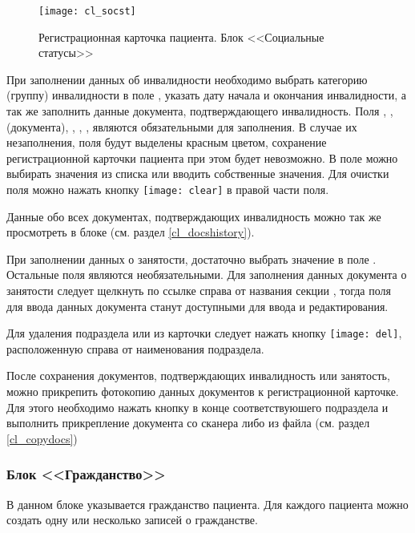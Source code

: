 {\begin{figure}[!ht]\centering
 \texttt{[image: cl\_socst]}
 \caption{Регистрационная карточка пациента. Блок <<Социальные статусы>>}
 \label{img_cl_socst}
\end{figure} 

При заполнении данных об инвалидности необходимо выбрать категорию (группу) инвалидности в поле , указать дату начала и окончания инвалидности, а так же заполнить данные документа, подтверждающего инвалидность. Поля , , (документа), , , ,  являются обязательными для заполнения.  В случае их незаполнения, поля будут выделены красным цветом, сохранение регистрационной карточки пациента при этом будет невозможно.
В поле  можно выбирать значения из списка или вводить собственные значения. Для очистки поля можно нажать кнопку \texttt{[image: clear]} в правой части поля.

\begin{prim}
Данные обо всех документах, подтверждающих инвалидность можно так же просмотреть в блоке  (см. раздел \ref{cl_docshistory}).
\end{prim}

При заполнении данных о занятости, достаточно выбрать значение в поле . Остальные поля являются необязательными. Для заполнения данных документа о занятости следует щелкнуть по ссылке  справа от названия секции , тогда поля для ввода данных документа станут доступными для ввода и редактирования.

Для удаления подраздела  или  из карточки следует нажать кнопку \texttt{[image: del]}, расположенную справа от наименования подраздела.

После сохранения документов, подтверждающих инвалидность или занятость, можно прикрепить фотокопию данных документов к регистрационной карточке. Для этого необходимо нажать кнопку  в конце соответствуюшего подраздела и выполнить прикрепление документа со сканера либо из файла (см. раздел \ref{cl_copydocs})

\subsubsection{Блок <<Гражданство>>}

В данном блоке указывается гражданство пациента. Для каждого пациента можно создать одну или несколько записей о гражданстве.

}
